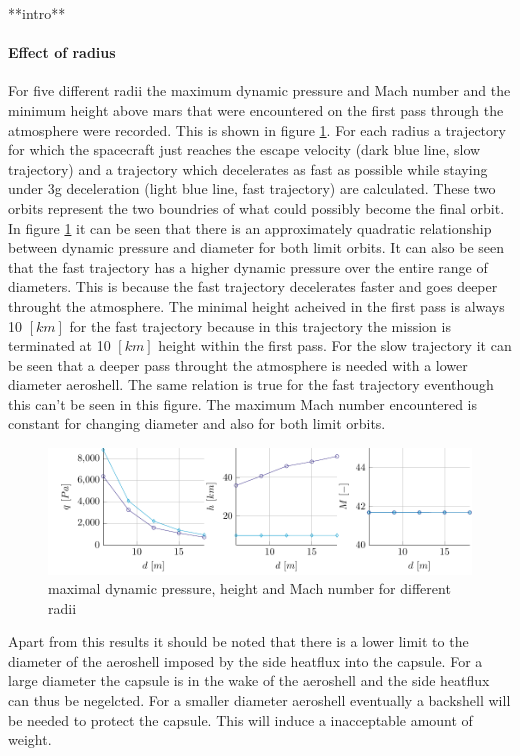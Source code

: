 **intro**

\paragraph{Effect of radius}

For five different radii the maximum dynamic pressure and Mach number and the minimum height above mars that were encountered on the first pass through the atmosphere were recorded. This is shown in figure \ref{fig:radius}. For each radius a trajectory for which the spacecraft just reaches the escape velocity (dark blue line, slow trajectory) and a trajectory which decelerates as fast as possible while staying under 3g deceleration (light blue line, fast trajectory) are calculated. These two orbits represent the two boundries of what could possibly become the final orbit. In figure \ref{fig:radius} it can be seen that there is an approximately quadratic relationship between dynamic pressure and diameter for both limit orbits. It can also be seen that the fast trajectory has a higher dynamic pressure over the entire range of diameters. This is because the fast trajectory decelerates faster and goes deeper throught the atmosphere. The minimal height acheived in the first pass is always 10 $\left[km\right]$ for the fast trajectory because in this trajectory the mission is terminated at 10 $\left[km\right]$ height within the first pass. For the slow trajectory it can be seen that a deeper pass throught the atmosphere is needed with a lower diameter aeroshell. The same relation is true for the fast trajectory eventhough this can't be seen in this figure. The maximum Mach number encountered is constant for changing diameter and also for both limit orbits.

\begin{figure}[H]
	\centering
	\includegraphics[width=1\textwidth]{./Figure/orbit/radius_param.pdf}
	\caption{maximal dynamic pressure, height and Mach number for different radii}
	\label{fig:radius}
\end{figure}


Apart from this results it should be noted that there is a lower limit to the diameter of the aeroshell imposed by the side heatflux into the capsule. For a large diameter the capsule is in the wake of the aeroshell and the side heatflux can thus be negelcted. For a smaller diameter aeroshell eventually a backshell will be needed to protect the capsule. This will induce a inacceptable amount of weight.

